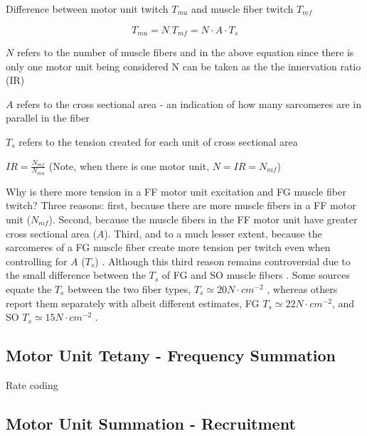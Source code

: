 Difference between motor unit twitch $T_{mu}$ and muscle fiber twitch $T_{mf}$


\begin{equation}
    T_{mu} = N_ \cdot T_{mf} = N \cdot A \cdot T_s
\end{equation}

$N$ refers to the number of muscle fibers and in the above equation since there is only one motor unit being considered N can be taken as the the innervation ratio (IR)

$A$ refers to the cross sectional area - an indication of how many sarcomeres are in parallel in the fiber

$T_s$ refers to the tension created for each unit of cross sectional area

$IR = \frac{N_{mf}}{N_{mu}}$ (Note, when there is one motor unit, $N = IR = N_{mf}$)

Why is there more tension in a FF motor unit excitation and FG muscle fiber twitch? Three reasons: first, because there are more muscle fibers in a FF motor unit ($N_{mf}$). Second, because the muscle fibers in the FF motor unit have greater cross sectional area ($A$). Third, and to a much lesser extent, because the sarcomeres of a FG muscle fiber create more tension per twitch even when controlling for $A$ ($T_s$) \cite{bodine_maximal_1987}. Although this third reason remains controversial due to the small difference between the $T_s$ of FG and SO muscle fibers \cite{lieber_skeletal_2010}. Some sources equate the $T_s$ between the two fiber types, $T_s \simeq 20 N \cdot cm^{-2}$ \cite{feher_quantitative_2017}, whereas others report them separately with albeit different estimates, FG $T_s \simeq 22 N \cdot cm^{-2}$, and SO $T_s \simeq 15 N \cdot cm^{-2}$ \cite{lieber_skeletal_2010}.






\subsection{Motor Unit Tetany - Frequency Summation}

Rate coding





\subsection{Motor Unit Summation - Recruitment}

